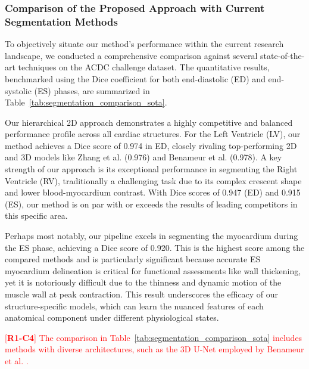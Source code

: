\documentclass[fleqn,10pt]{wlscirep}
\newcommand{\revtag}[2]{[\textbf{R#1-C#2}]}
\newcommand{\Rone}[1]{\textcolor{red}{#1}}
\begin{document}
\subsubsection*{Comparison of the Proposed Approach with Current Segmentation Methods}

To objectively situate our method's performance within the current research landscape, we conducted a comprehensive comparison against several state-of-the-art techniques on the ACDC challenge dataset. The quantitative results, benchmarked using the Dice coefficient for both end-diastolic (ED) and end-systolic (ES) phases, are summarized in Table~\ref{tab:segmentation_comparison_sota}.

Our hierarchical 2D approach demonstrates a highly competitive and balanced performance profile across all cardiac structures. For the Left Ventricle (LV), our method achieves a Dice score of 0.974 in ED, closely rivaling top-performing 2D and 3D models like Zhang et al. \cite{Zhang:2022} (0.976) and Benameur et al. \cite{Benameur:2025} (0.978). A key strength of our approach is its exceptional performance in segmenting the Right Ventricle (RV), traditionally a challenging task due to its complex crescent shape and lower blood-myocardium contrast. With Dice scores of 0.947 (ED) and 0.915 (ES), our method is on par with or exceeds the results of leading competitors in this specific area.

Perhaps most notably, our pipeline excels in segmenting the myocardium during the ES phase, achieving a Dice score of 0.920. This is the highest score among the compared methods and is particularly significant because accurate ES myocardium delineation is critical for functional assessments like wall thickening, yet it is notoriously difficult due to the thinness and dynamic motion of the muscle wall at peak contraction. This result underscores the efficacy of our structure-specific models, which can learn the nuanced features of each anatomical component under different physiological states.

\Rone{\revtag{1}{4} The comparison in Table~\ref{tab:segmentation_comparison_sota} includes methods with diverse architectures, such as the 3D U-Net employed by Benameur et al. \cite{Benameur:2025}.}
\end{document}
